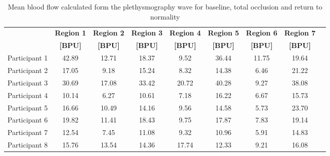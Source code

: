 \begin{table}[!htbp]
	\caption{Mean blood flow calculated form the plethysmography wave for baseline, total occlusion and return to normality}
	\label{tbl:LDF flow}
	\centering \small
	\begin{tabular}{lcccccccc}
		\toprule
		& \textbf{Region 1}
		& \textbf{Region 2}
		& \textbf{Region 3}
		& \textbf{Region 4}
		& \textbf{Region 5}
		& \textbf{Region 6}
		& \textbf{Region 7} \\
		& \textbf{[BPU]}
		& \textbf{[BPU]}
		& \textbf{[BPU]}		
		& \textbf{[BPU]}		
		& \textbf{[BPU]}
		& \textbf{[BPU]}
		& \textbf{[BPU]}\\\midrule
		Participant 1    &     42.89     &     12.71     &     18.37     &      9.52     &     36.44     &     11.75     &     19.64     \\  
		Participant 2    &     17.05     &      9.18     &     15.24     &      8.32     &     14.38     &      6.46     &     21.22     \\  
		Participant 3    &     30.69     &     17.08     &     33.42     &     20.72     &     40.28     &      9.27     &     38.08     \\  
		Participant 4    &     10.14     &      6.27     &     10.61     &      7.18     &     16.22     &      6.67     &     15.73     \\  
		Participant 5    &     16.66     &     10.49     &     14.16     &      9.56     &     14.58     &      5.73     &     23.70     \\  
		Participant 6    &     19.82     &     11.41     &     18.43     &      9.75     &     17.87     &      7.83     &     19.14     \\  
		Participant 7    &     12.54     &      7.45     &     11.08     &      9.32     &     10.96     &      5.91     &     14.83     \\  
		Participant 8    &     15.76     &     13.54     &     14.36     &     17.74     &     12.33     &      9.21     &     16.08     \\  
		\bottomrule
	\end{tabular}
\end{table}


